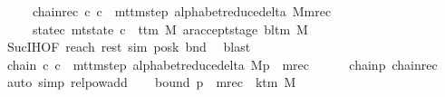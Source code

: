 \begin{isabellebody}
\ \ \ \ \ chainrec{\isacharcolon}{\kern0pt}\ {\isachardoublequoteopen}{\isacharparenleft}{\kern0pt}c{}{\isacharcomma}{\kern0pt}\ c{\isacharprime}{\kern0pt}{\isacharprime}{\kern0pt}{\isacharparenright}{\kern0pt}\ {\isasymin}\ {\isacharparenleft}{\kern0pt}mttm{\isacharunderscore}{\kern0pt}step\ {\isacharparenleft}{\kern0pt}alphabet{\isacharunderscore}{\kern0pt}reduce{\isacharunderscore}{\kern0pt}delta\ M{\isacharparenright}{\kern0pt}{\isacharparenright}{\kern0pt}{\isacharcircum}{\kern0pt}{\isacharcircum}{\kern0pt}m{\isacharunderscore}{\kern0pt}rec{\isachardoublequoteclose}\isanewline
\ \ \ \ \ statec{\isacharprime}{\kern0pt}{\isacharprime}{\kern0pt}{\isacharcolon}{\kern0pt}\ {\isachardoublequoteopen}mt{\isacharunderscore}{\kern0pt}state\ c{\isacharprime}{\kern0pt}{\isacharprime}{\kern0pt}\ {\isacharequal}{\kern0pt}\ {\isacharparenleft}{\kern0pt}t{\isacharunderscore}{\kern0pt}tm\ M{\isacharcomma}{\kern0pt}\ ar{\isacharunderscore}{\kern0pt}accept{\isacharunderscore}{\kern0pt}stage\ {\isacharparenleft}{\kern0pt}bl{\isacharunderscore}{\kern0pt}tm\ M{\isacharparenright}{\kern0pt}{\isacharparenright}{\kern0pt}{\isachardoublequoteclose}\isanewline
\ \ \ \ \isamarkupfalse%
\ Suc{\isachardot}{\kern0pt}IH{\isacharbrackleft}{\kern0pt}OF\ reach{}\ rest\ sim{}\ posk{}\ bnd{}{\isacharbrackright}{\kern0pt}\ \isamarkupfalse%
\ blast\isanewline
\ \ \isamarkupfalse%
\ chain{\isacharcolon}{\kern0pt}\ {\isachardoublequoteopen}{\isacharparenleft}{\kern0pt}c{\isacharprime}{\kern0pt}{\isacharcomma}{\kern0pt}\ c{\isacharprime}{\kern0pt}{\isacharprime}{\kern0pt}{\isacharparenright}{\kern0pt}\ {\isasymin}\ {\isacharparenleft}{\kern0pt}mttm{\isacharunderscore}{\kern0pt}step\ {\isacharparenleft}{\kern0pt}alphabet{\isacharunderscore}{\kern0pt}reduce{\isacharunderscore}{\kern0pt}delta\ M{\isacharparenright}{\kern0pt}{\isacharparenright}{\kern0pt}{\isacharcircum}{\kern0pt}{\isacharcircum}{\kern0pt}{\isacharparenleft}{\kern0pt}p\ {\isacharplus}{\kern0pt}\ m{\isacharunderscore}{\kern0pt}rec{\isacharparenright}{\kern0pt}{\isachardoublequoteclose}\isanewline
\ \ \ \ \isamarkupfalse%
\ chainp\ chainrec\ \isamarkupfalse%
\ {\isacharparenleft}{\kern0pt}auto\ simp{\isacharcolon}{\kern0pt}\ relpow{\isacharunderscore}{\kern0pt}add{\isacharparenright}{\kern0pt}\isanewline
\ \ \isamarkupfalse%
\ bound{\isacharcolon}{\kern0pt}\ {\isachardoublequoteopen}p\ {\isacharplus}{\kern0pt}\ m{\isacharunderscore}{\kern0pt}rec\ {\isasymle}\ {\isacharparenleft}{\kern0pt}k{\isacharunderscore}{\kern0pt}tm\ M\isanewline

\end{isabellebody}
